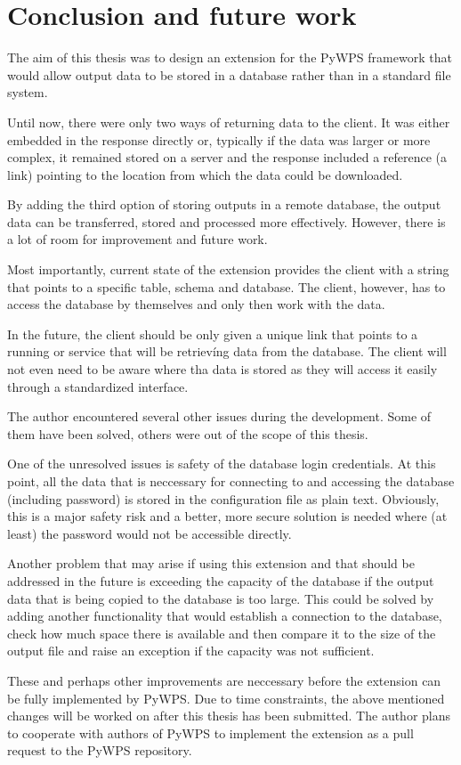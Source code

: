 \chapter{Conclusion and future work}
\label{5-conclusion}


The aim of this thesis was to design an extension for the PyWPS
framework that would allow output data to be stored in a database
rather than in a standard file system.

Until now, there were only two ways of returning data to the
client. It was either embedded in the response directly or, typically
if the data was larger or more complex, it remained stored on a server
and the response included a reference (a  link) pointing to
the location from which the data could be downloaded.

By adding the third option of storing outputs in a remote database,
the output data can be transferred, stored and processed more
effectively. However, there is a lot of room for improvement and
future work.

Most importantly, current state of the extension provides the client
with a string that points to a specific table, schema and
database. The client, however, has to access the database by
themselves and only then work with the data.

In the future, the client should be only given a unique  link
that points to a running  or  service that will be
retrievíng data from the database. The client will not even need to be
aware where tha data is stored as they will access it easily through a
standardized interface.

The author encountered several other issues during the
development. Some of them have been solved, others were out of the
scope of this thesis.

One of the unresolved issues is safety of the database login
credentials. At this point, all the data that is neccessary for
connecting to and accessing the database (including password) is
stored in the configuration file as plain text. Obviously, this is a
major safety risk and a better, more secure solution is needed where
(at least) the password would not be accessible directly.

Another problem that may arise if using this extension and that should
be addressed in the future is exceeding the capacity of the database
if the output data that is being copied to the database is too
large. This could be solved by adding another functionality that would
establish a connection to the database, check how much space there is
available and then compare it to the size of the output file and raise
an exception if the capacity was not sufficient.

These and perhaps other improvements are neccessary before the
extension can be fully implemented by PyWPS. Due to time constraints,
the above mentioned changes will be worked on after this thesis has
been submitted. The author plans to cooperate with authors of PyWPS to
implement the extension as a pull request to the PyWPS repository.



